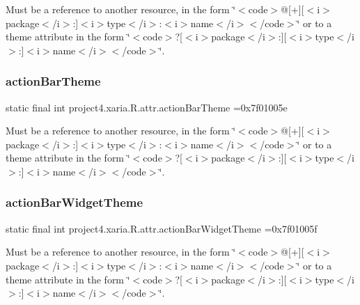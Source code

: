 Must be a reference to another resource, in the form \char`\"{}$<$code$>$@\mbox{[}+\mbox{]}\mbox{[}$<$i$>$package$<$/i$>$\+:\mbox{]}$<$i$>$type$<$/i$>$\+:$<$i$>$name$<$/i$>$$<$/code$>$\char`\"{} or to a theme attribute in the form \char`\"{}$<$code$>$?\mbox{[}$<$i$>$package$<$/i$>$\+:\mbox{]}\mbox{[}$<$i$>$type$<$/i$>$\+:\mbox{]}$<$i$>$name$<$/i$>$$<$/code$>$\char`\"{}. \mbox{\label{classproject4_1_1xaria_1_1R_1_1attr_a85a3a6317a99fe6e88e7b5eb5e3fb58a}} 
\subsubsection{\texorpdfstring{action\+Bar\+Theme}{actionBarTheme}}
{\footnotesize\ttfamily static final int project4.\+xaria.\+R.\+attr.\+action\+Bar\+Theme =0x7f01005e\hspace{0.3cm}{\ttfamily [static]}}

Must be a reference to another resource, in the form \char`\"{}$<$code$>$@\mbox{[}+\mbox{]}\mbox{[}$<$i$>$package$<$/i$>$\+:\mbox{]}$<$i$>$type$<$/i$>$\+:$<$i$>$name$<$/i$>$$<$/code$>$\char`\"{} or to a theme attribute in the form \char`\"{}$<$code$>$?\mbox{[}$<$i$>$package$<$/i$>$\+:\mbox{]}\mbox{[}$<$i$>$type$<$/i$>$\+:\mbox{]}$<$i$>$name$<$/i$>$$<$/code$>$\char`\"{}. \mbox{\label{classproject4_1_1xaria_1_1R_1_1attr_a01251e35360b84137e63ab443558df3a}} 
\subsubsection{\texorpdfstring{action\+Bar\+Widget\+Theme}{actionBarWidgetTheme}}
{\footnotesize\ttfamily static final int project4.\+xaria.\+R.\+attr.\+action\+Bar\+Widget\+Theme =0x7f01005f\hspace{0.3cm}{\ttfamily [static]}}

Must be a reference to another resource, in the form \char`\"{}$<$code$>$@\mbox{[}+\mbox{]}\mbox{[}$<$i$>$package$<$/i$>$\+:\mbox{]}$<$i$>$type$<$/i$>$\+:$<$i$>$name$<$/i$>$$<$/code$>$\char`\"{} or to a theme attribute in the form \char`\"{}$<$code$>$?\mbox{[}$<$i$>$package$<$/i$>$\+:\mbox{]}\mbox{[}$<$i$>$type$<$/i$>$\+:\mbox{]}$<$i$>$name$<$/i$>$$<$/code$>$\char`\"{}. \mbox{\label{classproject4_1_1xaria_1_1R_1_1attr_a81a0368697fe12e9d5526082bbe6191f}} 
